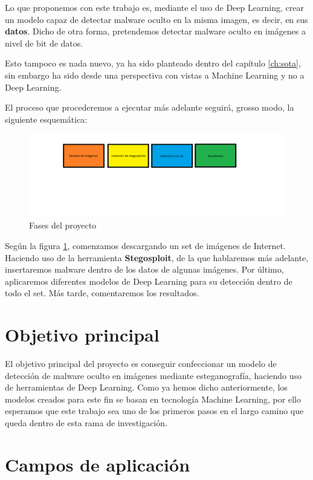 Lo que proponemos con este trabajo es, mediante el uso de Deep Learning, crear un modelo capaz de detectar malware oculto en la misma imagen, es decir, en sus \textbf{datos}. Dicho de otra forma, pretendemos detectar malware oculto en imágenes a nivel de bit de datos.

Esto tampoco es nada nuevo, ya ha sido planteado dentro del capítulo \ref{ch:sota}, sin embargo ha sido desde una perspectiva con vistas a Machine Learning y no a Deep Learning.

El proceso que procederemos a ejecutar más adelante seguirá, grosso modo, la siguiente esquemática:

\begin{figure}[h]
  \centering
  \includegraphics[width=16cm]{Figuras/Introduccion/Descripcion_Trabajo.png}
  \caption{Fases del proyecto}
  \label{fig:diagrama_bloques}
\end{figure}

Según la figura \ref{fig:diagrama_bloques}, comenzamos descargando un set de imágenes de Internet. Haciendo uso de la herramienta \textbf{Stegosploit}, de la que hablaremos más adelante, insertaremos malware dentro de los datos de algunas imágenes. Por último, aplicaremos diferentes modelos de Deep Learning para su detección dentro de todo el set. Más tarde, comentaremos los resultados.

\section{Objetivo principal}

El objetivo principal del proyecto es conseguir confeccionar un modelo de detección de malware oculto en imágenes mediante esteganografía, haciendo uso de herramientas de Deep Learning. Como ya hemos dicho anteriormente, los modelos creados para este fin se basan en tecnología Machine Learning, por ello esperamos que este trabajo sea uno de los primeros pasos en el largo camino que queda dentro de esta rama de investigación.

\section{Campos de aplicación}

